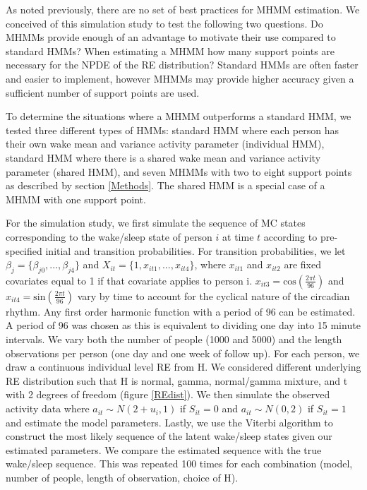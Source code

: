 \documentclass{article}
\begin{document}
As noted previously, there are no set of best practices for MHMM estimation. We conceived of this simulation study to test the following two questions. Do MHMMs provide enough of an advantage to motivate their use compared to standard HMMs? When estimating a MHMM how many support points are necessary for the NPDE of the RE distribution? Standard HMMs are often faster and easier to implement, however MHMMs may provide higher accuracy given a sufficient number of support points are used.

To determine the situations where a MHMM outperforms a standard HMM, we tested three different types of HMMs: standard HMM where each person has their own wake mean and variance activity parameter (individual HMM), standard HMM where there is a shared wake mean and variance activity parameter (shared HMM), and seven MHMMs with two to eight support points as described by section \ref{Methods}. The shared HMM is a special case of a MHMM with one support point. 

For the simulation study, we first simulate the sequence of MC states corresponding to the wake/sleep state of person $i$ at time $t$ according to pre-specified initial and transition probabilities. For transition probabilities, we let $\beta_j = \{\beta_{j0}, ..., \beta_{j4}\}$ and $X_{it} = \{1, x_{it1}, ..., x_{it4}\}$, where $x_{it1}$ and $x_{it2}$ are fixed covariates equal to 1 if that covariate applies to person i. $x_{it3} = \text{cos}(\frac{2\pi t}{96})$ and $x_{it4} = \text{sin}(\frac{2\pi t}{96})$ vary by time to account for the cyclical nature of the circadian rhythm.  Any first order harmonic function with a period of 96 can be estimated. A period of 96 was chosen as this is equivalent to dividing one day into 15 minute intervals. We vary both the number of people (1000 and 5000) and the length observations per person (one day and one week of follow up). For each person, we draw a continuous individual level RE from H. We considered different underlying RE distribution such that H is normal, gamma, normal/gamma mixture, and t with 2 degrees of freedom (figure \ref{REdist}). We then simulate the observed activity data where $a_{it} \sim N(2+u_i,1)$ if $S_{it}=0$ and $a_{it} \sim N(0,2)$ if $S_{it}=1$ and estimate the model parameters. Lastly, we use the Viterbi algorithm to construct the most likely sequence of the latent wake/sleep states given our estimated parameters. We compare the estimated sequence with the true wake/sleep sequence. This was repeated 100 times for each combination (model, number of people, length of observation, choice of H).
\end{document}
